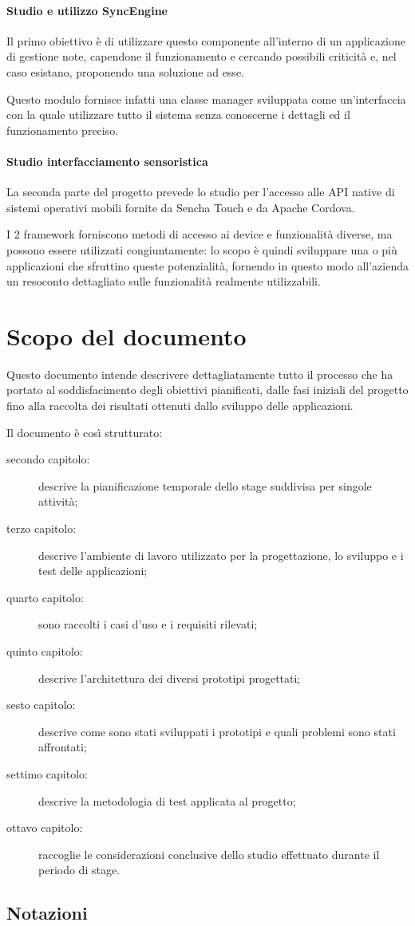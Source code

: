 \paragraph*{Studio e utilizzo SyncEngine}
Il primo obiettivo è di utilizzare questo componente all'interno di un applicazione di gestione note, capendone il funzionamento e cercando possibili criticità e, nel caso esistano, proponendo una soluzione ad esse.

Questo modulo fornisce infatti una classe manager sviluppata come un'interfaccia con la quale utilizzare tutto il sistema senza conoscerne i dettagli ed il funzionamento preciso.

\paragraph*{Studio interfacciamento sensoristica}
La seconda parte del progetto prevede lo studio per l'accesso alle \ac{API} native di sistemi operativi mobili fornite da Sencha Touch e da Apache Cordova.

I 2 framework forniscono metodi di accesso ai device e funzionalità diverse, ma possono essere utilizzati congiuntamente: lo scopo è quindi sviluppare una o più applicazioni che sfruttino queste potenzialità, fornendo in questo modo all'azienda un resoconto dettagliato sulle funzionalità realmente utilizzabili.


\section{Scopo del documento}
Questo documento intende descrivere dettagliatamente tutto il processo che ha portato al soddisfacimento degli obiettivi pianificati, dalle fasi iniziali del progetto fino alla raccolta dei risultati ottenuti dallo sviluppo delle applicazioni.

Il documento è così strutturato:
\begin{description}
\item[secondo capitolo:] descrive la pianificazione temporale dello stage suddivisa per singole attività; 
\item[terzo capitolo:] descrive l'ambiente di lavoro utilizzato per la progettazione, lo sviluppo e i test delle applicazioni;
\item[quarto capitolo:] sono raccolti i casi d'uso e i requisiti rilevati;
\item[quinto capitolo:] descrive l'architettura dei diversi prototipi progettati;
\item[sesto capitolo:] descrive come sono stati sviluppati i prototipi e quali problemi sono stati affrontati;
\item[settimo capitolo:] descrive la metodologia di test applicata al progetto;
\item[ottavo capitolo:] raccoglie le considerazioni conclusive dello studio effettuato durante il periodo di stage.
\end{description}
\subsection{Notazioni}